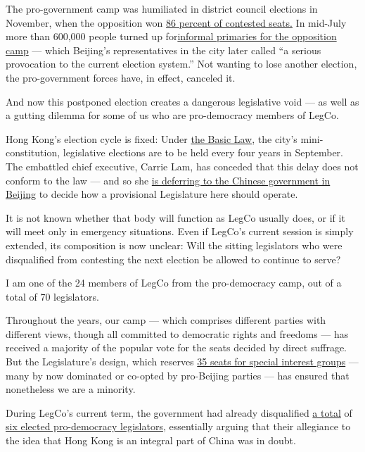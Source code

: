 The pro-government camp was humiliated in district council elections in
November, when the opposition won
\href{https://www.nytimes3xbfgragh.onion/2019/11/24/world/asia/hong-kong-election-results.html}{86
percent of contested seats.} In mid-July more than 600,000 people turned
up
for\href{https://hongkongfp.com/2020/07/14/serious-provocation-beijing-blasts-hong-kong-democrat-primaries-after-initial-results-reveal/}{informal
primaries for the opposition camp} --- which Beijing's representatives
in the city later called ``a serious provocation to the current election
system.'' Not wanting to lose another election, the pro-government
forces have, in effect, canceled it.

And now this postponed election creates a dangerous legislative void ---
as well as a gutting dilemma for some of us who are pro-democracy
members of LegCo.

Hong Kong's election cycle is fixed: Under
\href{https://www.basiclaw.gov.hk/en/basiclawtext/images/basiclaw_full_text_en.pdf}{the
Basic Law}, the city's mini-constitution, legislative elections are to
be held every four years in September. The embattled chief executive,
Carrie Lam, has conceded that this delay does not conform to the law ---
and so she
\href{https://www.info.gov.hk/gia/general/202007/31/P2020073101081.htm?fontSize=1}{is
deferring to the Chinese government in Beijing} to decide how a
provisional Legislature here should operate.

It is not known whether that body will function as LegCo usually does,
or if it will meet only in emergency situations. Even if LegCo's current
session is simply extended, its composition is now unclear: Will the
sitting legislators who were disqualified from contesting the next
election be allowed to continue to serve?

I am one of the 24 members of LegCo from the pro-democracy camp, out of
a total of 70 legislators.

Throughout the years, our camp --- which comprises different parties
with different views, though all committed to democratic rights and
freedoms --- has received a majority of the popular vote for the seats
decided by direct suffrage. But the Legislature's design, which reserves
\href{https://www.reo.gov.hk/en/voter/FC.htm}{35 seats for special
interest groups} --- many by now dominated or co-opted by pro-Beijing
parties --- has ensured that nonetheless we are a minority.

During LegCo's current term, the government had already disqualified
\href{https://www.nytimes3xbfgragh.onion/2016/11/08/world/asia/china-hong-kong-sixtus-leung-yau-wai-ching.html}{a
total} of
\href{https://www.nytimes3xbfgragh.onion/2017/07/14/world/asia/hong-kong-court-pro-democracy-lawmakers.html}{six
elected pro-democracy legislators}, essentially arguing that their
allegiance to the idea that Hong Kong is an integral part of China was
in doubt.

